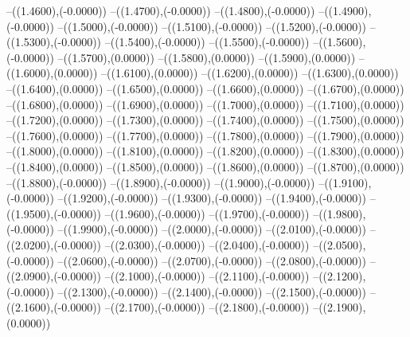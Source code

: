 {	--({\sx*(1.4600)},{\sy*(-0.0000)})
	--({\sx*(1.4700)},{\sy*(-0.0000)})
	--({\sx*(1.4800)},{\sy*(-0.0000)})
	--({\sx*(1.4900)},{\sy*(-0.0000)})
	--({\sx*(1.5000)},{\sy*(-0.0000)})
	--({\sx*(1.5100)},{\sy*(-0.0000)})
	--({\sx*(1.5200)},{\sy*(-0.0000)})
	--({\sx*(1.5300)},{\sy*(-0.0000)})
	--({\sx*(1.5400)},{\sy*(-0.0000)})
	--({\sx*(1.5500)},{\sy*(-0.0000)})
	--({\sx*(1.5600)},{\sy*(-0.0000)})
	--({\sx*(1.5700)},{\sy*(0.0000)})
	--({\sx*(1.5800)},{\sy*(0.0000)})
	--({\sx*(1.5900)},{\sy*(0.0000)})
	--({\sx*(1.6000)},{\sy*(0.0000)})
	--({\sx*(1.6100)},{\sy*(0.0000)})
	--({\sx*(1.6200)},{\sy*(0.0000)})
	--({\sx*(1.6300)},{\sy*(0.0000)})
	--({\sx*(1.6400)},{\sy*(0.0000)})
	--({\sx*(1.6500)},{\sy*(0.0000)})
	--({\sx*(1.6600)},{\sy*(0.0000)})
	--({\sx*(1.6700)},{\sy*(0.0000)})
	--({\sx*(1.6800)},{\sy*(0.0000)})
	--({\sx*(1.6900)},{\sy*(0.0000)})
	--({\sx*(1.7000)},{\sy*(0.0000)})
	--({\sx*(1.7100)},{\sy*(0.0000)})
	--({\sx*(1.7200)},{\sy*(0.0000)})
	--({\sx*(1.7300)},{\sy*(0.0000)})
	--({\sx*(1.7400)},{\sy*(0.0000)})
	--({\sx*(1.7500)},{\sy*(0.0000)})
	--({\sx*(1.7600)},{\sy*(0.0000)})
	--({\sx*(1.7700)},{\sy*(0.0000)})
	--({\sx*(1.7800)},{\sy*(0.0000)})
	--({\sx*(1.7900)},{\sy*(0.0000)})
	--({\sx*(1.8000)},{\sy*(0.0000)})
	--({\sx*(1.8100)},{\sy*(0.0000)})
	--({\sx*(1.8200)},{\sy*(0.0000)})
	--({\sx*(1.8300)},{\sy*(0.0000)})
	--({\sx*(1.8400)},{\sy*(0.0000)})
	--({\sx*(1.8500)},{\sy*(0.0000)})
	--({\sx*(1.8600)},{\sy*(0.0000)})
	--({\sx*(1.8700)},{\sy*(0.0000)})
	--({\sx*(1.8800)},{\sy*(-0.0000)})
	--({\sx*(1.8900)},{\sy*(-0.0000)})
	--({\sx*(1.9000)},{\sy*(-0.0000)})
	--({\sx*(1.9100)},{\sy*(-0.0000)})
	--({\sx*(1.9200)},{\sy*(-0.0000)})
	--({\sx*(1.9300)},{\sy*(-0.0000)})
	--({\sx*(1.9400)},{\sy*(-0.0000)})
	--({\sx*(1.9500)},{\sy*(-0.0000)})
	--({\sx*(1.9600)},{\sy*(-0.0000)})
	--({\sx*(1.9700)},{\sy*(-0.0000)})
	--({\sx*(1.9800)},{\sy*(-0.0000)})
	--({\sx*(1.9900)},{\sy*(-0.0000)})
	--({\sx*(2.0000)},{\sy*(-0.0000)})
	--({\sx*(2.0100)},{\sy*(-0.0000)})
	--({\sx*(2.0200)},{\sy*(-0.0000)})
	--({\sx*(2.0300)},{\sy*(-0.0000)})
	--({\sx*(2.0400)},{\sy*(-0.0000)})
	--({\sx*(2.0500)},{\sy*(-0.0000)})
	--({\sx*(2.0600)},{\sy*(-0.0000)})
	--({\sx*(2.0700)},{\sy*(-0.0000)})
	--({\sx*(2.0800)},{\sy*(-0.0000)})
	--({\sx*(2.0900)},{\sy*(-0.0000)})
	--({\sx*(2.1000)},{\sy*(-0.0000)})
	--({\sx*(2.1100)},{\sy*(-0.0000)})
	--({\sx*(2.1200)},{\sy*(-0.0000)})
	--({\sx*(2.1300)},{\sy*(-0.0000)})
	--({\sx*(2.1400)},{\sy*(-0.0000)})
	--({\sx*(2.1500)},{\sy*(-0.0000)})
	--({\sx*(2.1600)},{\sy*(-0.0000)})
	--({\sx*(2.1700)},{\sy*(-0.0000)})
	--({\sx*(2.1800)},{\sy*(-0.0000)})
	--({\sx*(2.1900)},{\sy*(0.0000)})
}
